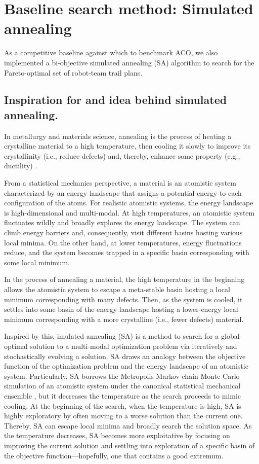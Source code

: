 \documentclass[fleqn,10pt,lineno]{wlpeerj}
\begin{document}
\section{Baseline search method: Simulated annealing}
As a competitive baseline against which to benchmark ACO, we also implemented a bi-objective simulated annealing (SA) algorithm \cite{kirkpatrick1983optimization,simon2013evolutionary,zomaya2010simulated} to search for the Pareto-optimal set of robot-team trail plans.

\subsection{Inspiration for and idea behind simulated annealing.}
In metallurgy and materials science, annealing is the process of heating a crystalline material to a high temperature, then cooling it slowly to improve its crystallinity (i.e., reduce defects) and, thereby, enhance some property (e.g., ductility) \cite{callister2020materials}.

From a statistical mechanics \cite{chandler1987introduction} perspective, a material is an atomistic system characterized by an energy landscape that assigns a potential energy to each configuration of the atoms. For realistic atomistic systems, the energy landscape is high-dimensional and multi-modal. At high temperatures, an atomistic system fluctuates wildly and broadly explores its energy landscape. The system can climb energy barriers and, consequently, visit different basins hosting various local minima.
On the other hand, at lower temperatures, energy fluctuations reduce, and the system becomes trapped in a specific basin corresponding with some local minimum.

In the process of annealing a material, the high temperature in the beginning allows the atomistic system to escape a meta-stable basin hosting a local minimum corresponding with many defects. 
Then, as the system is cooled, it settles into some basin of the energy landscape hosting a lower-energy local minimum corresponding with a more crystalline (i.e., fewer defects) material.
  
Inspired by this, imulated annealing (SA) \cite{kirkpatrick1983optimization,simon2013evolutionary,zomaya2010simulated} is a method to search for a global-optimal solution to a multi-modal optimization problem via iteratively and stochastically evolving a solution.
SA draws an analogy between the objective function of the optimization problem and the energy landscape of an atomistic system. 
Particularly, SA borrows the Metropolis Markov chain Monte Carlo simulation of an atomistic system under the canonical statistical mechanical ensemble \cite{frenkel2023understanding}, but it decreases the temperature as the search proceeds to mimic cooling. 
   At the beginning of the search, when the temperature is high, SA is highly exploratory by often moving to a worse solution than the current one.
   Thereby, SA can escape local minima and broadly search the solution space.
  As the temperature decreases, SA becomes more exploitative by focusing on improving the current solution and settling into exploration of a specific basin of the objective function---hopefully, one that contains a good extremum. 
 
\end{document}
